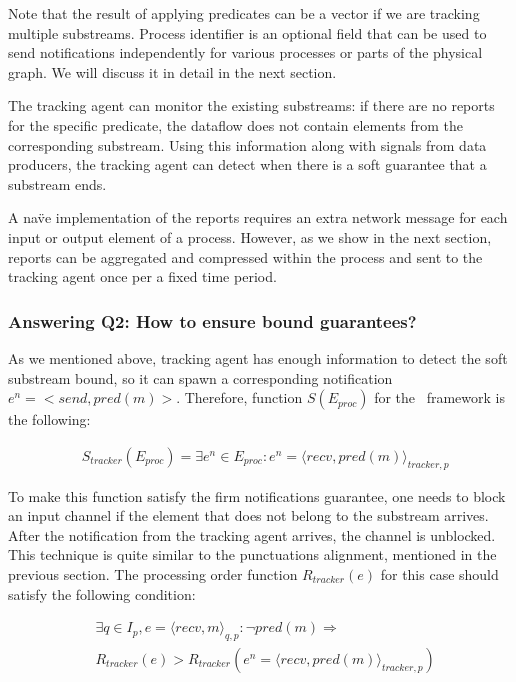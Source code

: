 Note that the result of applying predicates can be a vector if we are tracking multiple substreams. Process identifier is an optional field that can be used to send notifications independently for various processes or parts of the physical graph. We will discuss it in detail in the next section.

The tracking agent can monitor the existing substreams: if there are no reports for the specific predicate, the dataflow does not contain elements from the corresponding substream. Using this information along with signals from data producers, the tracking agent can detect when there is a soft guarantee that a substream ends.

A na\"ve implementation of the reports requires an extra network message for each input or output element of a process. However, as we show in the next section, reports can be aggregated and compressed within the process and sent to the tracking agent once per a fixed time period.

\subsubsection{Answering Q2: How to ensure bound guarantees?}

As we mentioned above, tracking agent has enough information to detect the soft substream bound, so it can spawn a corresponding notification $e^{n} = <send,pred(m)>$. Therefore, function $S(E_{proc})$ for the \tracker\ framework is the following:

\begin{align*}
& S_{tracker}(E_{proc}) = \exists e^{n} \in E_{proc} : e^{n} = \langle recv,pred(m)\rangle_{tracker,p}
\end{align*}

To make this function satisfy the firm notifications guarantee, one needs to block an input channel if the element that does not belong to the substream arrives. After the notification from the tracking agent arrives, the channel is unblocked. This technique is quite similar to the punctuations alignment, mentioned in the previous section. The processing order function $R_{tracker}(e)$ for this case should satisfy the following condition:

\begin{align*}
& \exists q \in I_p, e = \langle recv,m \rangle_{q,p}: \neg pred(m) \Longrightarrow \\ 
& R_{tracker}(e) > R_{tracker}(e^{n}= \langle recv,pred(m) \rangle_{tracker,p})
\end{align*}

